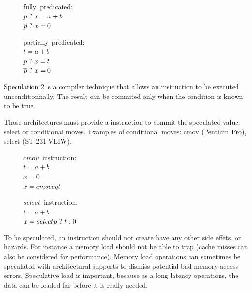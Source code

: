\begin{figure}
\begin{minipage}[t]{4cm}
\mbox{fully predicated:} \\
$ p ~?~ x = a + b $ \\
$ \overline{p} ~?~ x = 0 $ \\
\end{minipage}
\begin{minipage}[t]{4cm}
\mbox{partially predicated:} \\
$t = a + b $ \\
$p ~?~ x = t $ \\
$\overline{p} ~?~ x = 0 $ \\
\end{minipage}
\label{fig:pred}
\end{figure}

Speculation \ref{fig:spec} is a compiler technique that allows an instruction to be executed unconditionnally. The result can be commited only when the condition is known to be true.

Those architectures must provide a instruction to commit the speculated value. select or conditional moves. Examples of conditional moves: cmov (Pentium Pro), select (ST 231 VLIW).

\begin{figure}
\begin{minipage}[t]{4cm}
\mbox{$cmov$ instruction:} \\
$t = a + b $ \\
$x = 0 $ \\
$x = cmoveq t $ \\
\end{minipage}
\begin{minipage}[t]{4cm}
\mbox{$select$ instruction:} \\
$t = a + b $ \\
$x = select p ~?~ t : 0 $ \\
\end{minipage}
\label{fig:spec}
\end{figure}

To be speculated, an instruction should not create have any other side effets, or hazards. For instance a memory load should not be able to trap (cache misses can also be considered for performance). 
Memory load operations can sometimes be speculated with architectural supports to dismiss potential bad memory access errors. Speculative load is important, because as a long latency operations, the data can be loaded far before it is really needed. 

